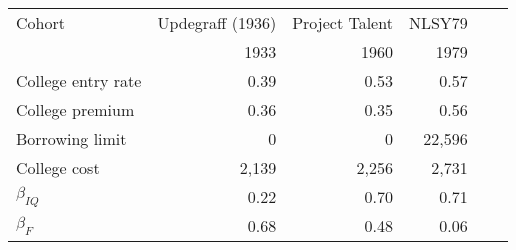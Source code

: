 \begin{tabular}{lrrrrr}
\hline
Cohort & Updegraff (1936)  & Project Talent  & NLSY79  &   &   \\ 
  & 1933  & 1960  & 1979  &   &   \\ 
\hline
College entry rate & 0.39  & 0.53  & 0.57  &   &   \\ 
College premium & 0.36  & 0.35  & 0.56  &   &   \\ 
Borrowing limit & 0  & 0  & 22,596  &   &   \\ 
College cost & 2,139  & 2,256  & 2,731  &   &   \\ 
\hline
$\beta_{IQ}$ & 0.22  & 0.70  & 0.71  &   &   \\ 
$\beta_{F}$ & 0.68  & 0.48  & 0.06  &   &   \\ 
\hline
\end{tabular}%
